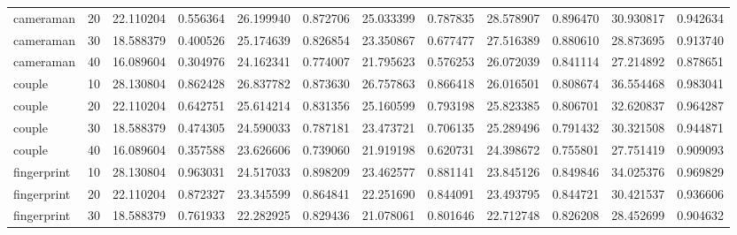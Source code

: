 \begin{tabular}{lrrrrrrrrrrr}
   cameraman &     20 &   22.110204 &    0.556364 &             26.199940 &              0.872706 &        25.033399 &         0.787835 &         28.578907 &          0.896470 &          30.930817 &           0.942634 \\
   cameraman &     30 &   18.588379 &    0.400526 &             25.174639 &              0.826854 &        23.350867 &         0.677477 &         27.516389 &          0.880610 &          28.873695 &           0.913740 \\
   cameraman &     40 &   16.089604 &    0.304976 &             24.162341 &              0.774007 &        21.795623 &         0.576253 &         26.072039 &          0.841114 &          27.214892 &           0.878651 \\
      couple &     10 &   28.130804 &    0.862428 &             26.837782 &              0.873630 &        26.757863 &         0.866418 &         26.016501 &          0.808674 &          36.554468 &           0.983041 \\
      couple &     20 &   22.110204 &    0.642751 &             25.614214 &              0.831356 &        25.160599 &         0.793198 &         25.823385 &          0.806701 &          32.620837 &           0.964287 \\
      couple &     30 &   18.588379 &    0.474305 &             24.590033 &              0.787181 &        23.473721 &         0.706135 &         25.289496 &          0.791432 &          30.321508 &           0.944871 \\
      couple &     40 &   16.089604 &    0.357588 &             23.626606 &              0.739060 &        21.919198 &         0.620731 &         24.398672 &          0.755801 &          27.751419 &           0.909093 \\
 fingerprint &     10 &   28.130804 &    0.963031 &             24.517033 &              0.898209 &        23.462577 &         0.881141 &         23.845126 &          0.849846 &          34.025376 &           0.969829 \\
 fingerprint &     20 &   22.110204 &    0.872327 &             23.345599 &              0.864841 &        22.251690 &         0.844091 &         23.493795 &          0.844721 &          30.421537 &           0.936606 \\
 fingerprint &     30 &   18.588379 &    0.761933 &             22.282925 &              0.829436 &        21.078061 &         0.801646 &         22.712748 &          0.826208 &          28.452699 &           0.904632 \\

\end{tabular}
